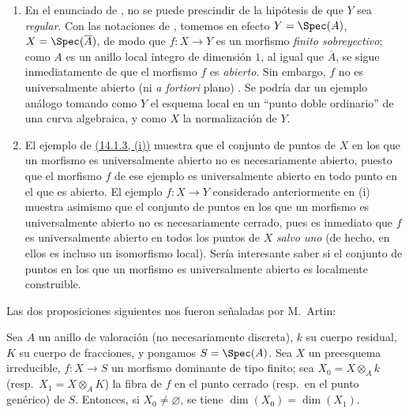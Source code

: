 \begin{remarks}[14.3.9]
\label{IV.14.3.9}
\begin{enumerate}[label=(\roman*)]
  \item En el enunciado de , no se puede prescindir de la hipótesis de que $Y$ sea \emph{regular}.
  Con las notaciones de , tomemos en efecto $Y=\Spec(A)$, $X=\Spec(\overline{A})$, de modo que $f:X\to Y$ es un morfismo \emph{finito sobreyectivo}; como $A$ es un anillo local íntegro de dimensión $1$, al igual que $\overline{A}$, se sigue inmediatamente de  que el morfismo $f$ es \emph{abierto}.
  Sin embargo, $f$ no es universalmente abierto (ni \emph{a fortiori} plano) .
  Se podría dar un ejemplo análogo tomando como $Y$ el esquema local en un ``punto doble ordinario'' de una curva algebraica, y como $X$ la normalización de $Y$.

  \item El ejemplo de {\hyperlink{ega4.c04.item.14-1-3}{(14.1.3, (i))}} muestra que el conjunto de puntos de $X$ en los que un morfismo es universalmente abierto no es necesariamente abierto, puesto que el morfismo $f$ de ese ejemplo es universalmente abierto en todo punto en el que es abierto.
  El ejemplo $f:X\to Y$ considerado anteriormente en (i) muestra asimismo que el conjunto de puntos en los que un morfismo es universalmente abierto no es necesariamente cerrado, pues es inmediato que $f$ es universalmente abierto en todos los puntos de $X$ \emph{salvo uno} (de hecho, en ellos es incluso un isomorfismo local).
  Sería interesante saber si el conjunto de puntos en los que un morfismo es universalmente abierto es localmente construible.
\end{enumerate}
\end{remarks}

Las dos proposiciones siguientes nos fueron señaladas por M.\ Artin:

\begin{lemma}[14.3.10]
\label{IV.14.3.10}
Sea $A$ un anillo de valoración (no necesariamente discreta), $k$ su cuerpo residual, $K$ su cuerpo de fracciones, y pongamos $S=\Spec(A)$.
Sea $X$ un preesquema irreducible, $f:X\to S$ un morfismo dominante de tipo finito; sea $X_0=X\otimes_A k$ \textup{(resp.}\ $X_1=X\otimes_A K$\textup{)} la fibra de $f$ en el punto cerrado \textup{(resp.}\ en el punto genérico\textup{)} de $S$.
Entonces, si $X_0\neq\varnothing$, se tiene $\dim(X_0)=\dim(X_1)$.
\end{lemma}

